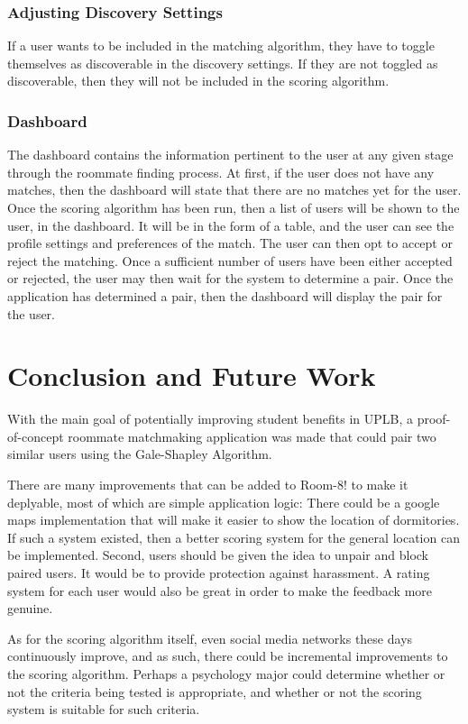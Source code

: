 \documentclass[journal]{IEEEtran}
\begin{document}
        \subsubsection{Adjusting Discovery Settings}
        If a user wants to be included in the matching algorithm, they have to toggle themselves as discoverable in the
        discovery settings. If they are not toggled as discoverable, then they will not be included in the scoring
        algorithm.

        \subsubsection{Dashboard}
        The dashboard contains the information pertinent to the user at any given stage through the roommate finding
        process. At first, if the user does not have any matches, then the dashboard will state that there are no
        matches yet for the user. Once the scoring algorithm has been run, then a list of users will be shown to the
        user, in the dashboard. It will be in the form of a table, and the user can see the profile settings and
        preferences of the match. The user can then opt to accept or reject the matching. Once a sufficient number of
        users have been either accepted or rejected, the user may then wait for the system to determine a pair. Once the
        application has determined a pair, then the dashboard will display the pair for the user.

\section{Conclusion and Future Work}
With the main goal of potentially improving student benefits in UPLB, a proof-of-concept roommate matchmaking
application was made that could pair two similar users using the Gale-Shapley Algorithm. 

There are many improvements that can be added to Room-8! to make it deplyable, most of which are simple application
logic: There could be a google maps implementation that will make it easier to show the location of dormitories. If such
a system existed, then a better scoring system for the general location can be implemented. Second, users should be
given the idea to unpair and block paired users. It would be to provide protection against harassment. A rating system
for each user would also be great in order to make the feedback more genuine.

As for the scoring algorithm itself, even social media networks these days continuously improve, and as such, there
could be incremental improvements to the scoring algorithm. Perhaps a psychology major could determine whether or not
the criteria being tested is appropriate, and whether or not the scoring system is suitable for such criteria.
\end{document}
